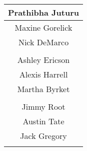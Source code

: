 \documentclass{article}
\begin{document}
\begin{center}
\begin{tabular}{|c|}
 Prathibha Juturu\\ \hline 
 Maxine Gorelick\\ \hline 
 Nick DeMarco\\ \hline 
\multicolumn{1}{c}{\vspace{1mm}} \\ 
\hline 
 Ashley Ericson\\ \hline 
 Alexis Harrell\\ \hline 
 Martha Byrket\\ \hline 
\multicolumn{1}{c}{\vspace{1mm}} \\ 
\hline 
 Jimmy Root\\ \hline 
 Austin Tate\\ \hline 
 Jack Gregory\\ \hline 
\multicolumn{1}{c}{\vspace{1mm}} \\ 

\end{tabular} \\ 
\end{center}
\end{document}
